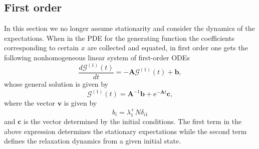 \documentclass[a4paper, 11pt]{article}
\begin{document}
\subsection{First order}\label{subsec:o1_nonstat_problem}
In this section we no longer assume stationarity and consider the dynamics of the expectations. When in the PDE for the generating function the coefficients corresponding to certain $x$ are collected and equated, in first order one gets the following nonhomogeneous linear system of first-order ODEs
\begin{equation}
\frac{d\boldsymbol{\mathcal G}^{(1)}(t)}{dt} = -\mathbf A \boldsymbol{\mathcal G}^{(1)}(t) + \mathbf b,
\end{equation}
whose general solution is given by
\begin{equation}\label{general_solution}
  \boldsymbol{\mathcal G}^{(1)}(t) = \mathbf A^{-1}\mathbf b + \mathrm e^{-\mathbf A t}\mathbf c,
\end{equation}
where the vector $\mathbf v$ is given by
\begin{equation}\label{rhs_vector}
  b_i=\lambda^+_1N\delta_{i1}
\end{equation}
and $\mathbf c$ is the vector determined by the initial conditions. The first term in the above expression determines the stationary expectations while the second term defines the relaxation dynamics from a given initial state.
\end{document}
